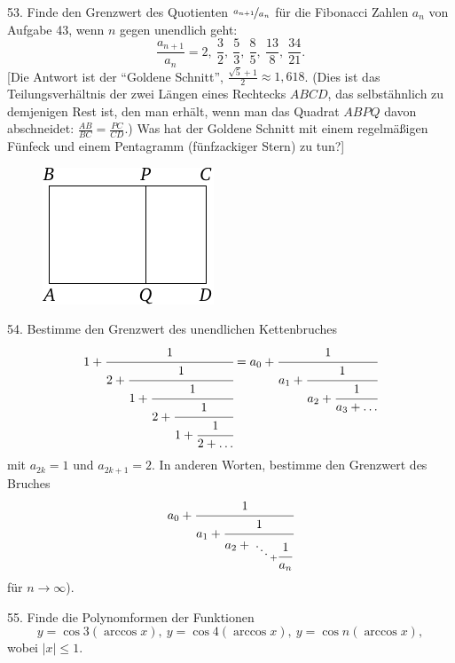 \begin{problem}{53.}
	Finde den Grenzwert des Quotienten $\nicefrac{a_{n+1}}{a_n}$ für die Fibonacci Zahlen $a_n$ von Aufgabe 43, wenn $n$ gegen unendlich geht:
	\begin{equation*}
		\frac{a_{n+1}}{a_n}=2,\ \frac 32,\ \frac53, \ \frac85, \ \frac{13}8,
		\ \frac{34}{21}.
	\end{equation*}
	[Die Antwort ist der \enquote{Goldene Schnitt},
	$\frac{\sqrt{5}+1}{2} \approx 1{,}618$. (Dies ist das Tei\-lungs\-ver\-hält\-nis der zwei Längen eines Rechtecks $ABCD$, das selbstähnlich zu demjenigen Rest ist, den man erhält, wenn man das Quadrat $ABPQ$ davon abschneidet: 
	$\frac{AB}{BC}=\frac{PC}{CD}$.) Was hat der Goldene Schnitt mit einem regelmäßigen Fünfeck und einem Pentagramm (fünfzackiger Stern) zu tun?]
	\begin{figure}
		\includegraphics{taskbook-37}
	\end{figure}
\end{problem}

\begin{problem}{54.}
	Bestimme den Grenzwert des unendlichen Kettenbruches
	\begin{equation*}
		1+\cfrac{1}{2+\cfrac{1}{1+\cfrac{1}{2+\cfrac{1}{1+\cfrac{1}{2+\ldots}}}}}=
		a_0+\cfrac{1}{a_1+\cfrac{1}{a_2+\cfrac{1}{a_3+\dots}}}
	\end{equation*}
	mit $a_{2k}=1$ und $a_{2k+1}=2$. In anderen Worten, bestimme den Grenzwert des Bruches
	\begin{equation*}
		a_0+\cfrac{1}{a_1+\cfrac{1}{a_2+{\atop{\ddots \atop {}} + \cfrac{1}{a_n}}}}
	\end{equation*}
	für $n \to \infty$).
\end{problem}

\begin{problem}{55.}
	Finde die Polynomformen der Funktionen 
	\begin{equation*}
		y=\cos 3 (\arccos x),\ y=\cos 4 (\arccos x),\ 
		y=\cos n (\arccos x),
	\end{equation*}
	wobei $|x| \leqslant 1$.
\end{problem}

